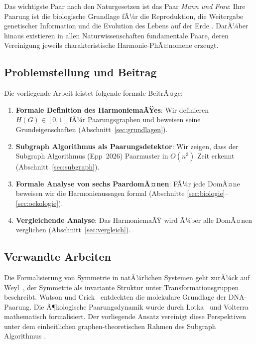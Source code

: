﻿\documentclass[a4paper,12pt]{article}
\theoremstyle{definition}
\begin{document}
Das wichtigste Paar nach den Naturgesetzen ist das Paar \emph{Mann und Frau}: Ihre
Paarung ist die biologische Grundlage fÃ¼r die Reproduktion, die Weitergabe genetischer
Information und die Evolution des Lebens auf der Erde \cite{darwin1859,mayr1963}.
DarÃ¼ber hinaus existieren in allen Naturwissenschaften fundamentale Paare, deren Vereinigung
jeweils charakteristische Harmonie-PhÃ¤nomene erzeugt.

\subsection{Problemstellung und Beitrag}

Die vorliegende Arbeit leistet folgende formale BeitrÃ¤ge:

\begin{enumerate}
	\item \textbf{Formale Definition des HarmoniemaÃŸes}: Wir definieren $H(G) \in [0,1]$
	fÃ¼r Paarungsgraphen und beweisen seine Grundeigenschaften (Abschnitt~\ref{sec:grundlagen}).
	
	\item \textbf{Subgraph Algorithmus als Paarungsdetektor}: Wir zeigen, dass der
	Subgraph Algorithmus (Epp~2026) Paarmuster in $O(n^3)$ Zeit erkennt
	(Abschnitt~\ref{sec:subgraph}).
	
	\item \textbf{Formale Analyse von sechs PaardomÃ¤nen}: FÃ¼r jede DomÃ¤ne beweisen wir
	die Harmonieaussagen formal (Abschnitte \ref{sec:biologie}--\ref{sec:oekologie}).
	
	\item \textbf{Vergleichende Analyse}: Das HarmoniemaÃŸ wird Ã¼ber alle DomÃ¤nen
	verglichen (Abschnitt~\ref{sec:vergleich}).
\end{enumerate}

\subsection{Verwandte Arbeiten}

Die Formalisierung von Symmetrie in natÃ¼rlichen Systemen geht zurÃ¼ck auf Weyl~\cite{weyl1952},
der Symmetrie als invariante Struktur unter Transformationsgruppen beschreibt.
Watson und Crick~\cite{watson1953} entdeckten die molekulare Grundlage der DNA-Paarung.
Die Ã¶kologische Paarungsdynamik wurde durch Lotka~\cite{lotka1925} und
Volterra~\cite{volterra1926} mathematisch formalisiert. Der vorliegende Ansatz
vereinigt diese Perspektiven unter dem einheitlichen graphen-theoretischen Rahmen des
Subgraph Algorithmus \cite{epp2026}.
\end{document}
